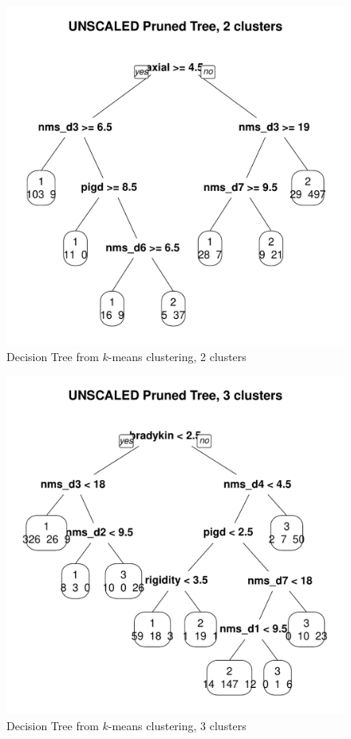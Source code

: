 \documentclass[letterpaper,12pt]{article}
\begin{document}
\begin{figure}[h]
  \centering
  \includegraphics[width=\linewidth]{dtree-kmeans-pruned-unscaled-2.pdf}
  \caption{Decision Tree from $k$-means clustering, 2 clusters}
  \label{fig:kmeans-dtree-2}
\end{figure}

\begin{figure}[h]
  \centering
  \includegraphics[width=\linewidth]{dtree-kmeans-pruned-unscaled-3.pdf}
  \caption{Decision Tree from $k$-means clustering, 3 clusters}
  \label{fig:kmeans-dtree-3}
\end{figure}
\end{document}
